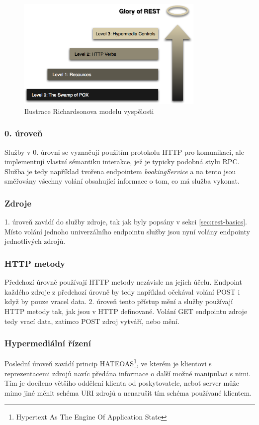 \documentclass[czech,DP]{thesiskiv}
\begin{document}
\begin{figure}[h]
	\centering
	\includegraphics[width=9cm]{richardsonMaturityModel}
	\caption{Ilustrace Richardsonova modelu vyspělosti}
	\label{fig:rmm}
\end{figure}


\subsubsection{0. úroveň}
Služby v 0. úrovni se vyznačují použitím protokolu HTTP pro komunikaci, ale implementují vlastní sémantiku interakce, jež je typicky podobná stylu RPC. Služba je tedy například tvořena endpointem \textit{bookingService} a na tento jsou směřovány všechny volání obsahující informace o tom, co má služba vykonat. 

\subsubsection{Zdroje}
1. úroveň zavádí do služby zdroje, tak jak byly popsány v sekci \ref{sec:rest-basics}. Místo volání jednoho univerzálního endpointu služby jsou nyní volány endpointy jednotlivých zdrojů.

\subsubsection{HTTP metody}
Předchozí úrovně používají HTTP metody nezávisle na jejich účelu. Endpoint každého zdroje z předchozí úrovně by tedy například očekával volání POST i když by pouze vracel data. 2. úroveň tento přístup mění a služby používají HTTP metody tak, jak jsou v HTTP definované. Volání GET endpointu zdroje tedy vrací data, zatímco POST zdroj vytváří, nebo mění. 

\subsubsection{Hypermediální řízení}
Poslední úroveň zavádí princip HATEOAS\footnote{Hypertext As The Engine Of Application State}, ve kterém je klientovi s reprezentacemi zdrojů navíc předána informace o další možné manipulaci s nimi. Tím je docíleno většího oddělení klienta od poskytovatele, neboť server může mimo jiné měnit schéma URI zdrojů a nenarušit tím schéma používané klientem.
\end{document}

